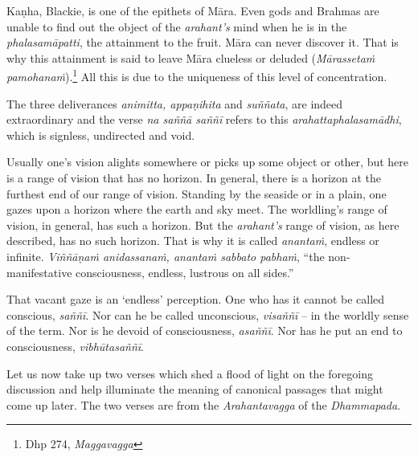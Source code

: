 Kaṇha, Blackie, is one of the epithets of Māra. Even gods and Brahmas are unable to find out the object of the \emph{arahant's} mind when he is in the \emph{phalasamāpatti}, the attainment to the fruit. Māra can never discover it. That is why this attainment is said to leave Māra clueless or deluded (\emph{Mārassetaṁ pamohanaṁ}).\footnote{Dhp 274, \emph{Maggavagga}} All this is due to the uniqueness of this level of concentration.

The three deliverances \emph{animitta, appaṇihita} and \emph{suññata}, are indeed extraordinary and the verse \emph{na saññā saññī} refers to this \emph{arahattaphalasamādhi}, which is signless, undirected and void.

Usually one's vision alights somewhere or picks up some object or other, but here is a range of vision that has no horizon. In general, there is a horizon at the furthest end of our range of vision. Standing by the seaside or in a plain, one gazes upon a horizon where the earth and sky meet. The worldling's range of vision, in general, has such a horizon. But the \emph{arahant's} range of vision, as here described, has no such horizon. That is why it is called \emph{anantaṁ}, endless or infinite. \emph{Viññāṇaṁ anidassanaṁ, anantaṁ sabbato pabhaṁ}, ``the non-manifestative consciousness, endless, lustrous on all sides.''

That vacant gaze is an `endless' perception. One who has it cannot be called conscious, \emph{saññī}. Nor can he be called unconscious, \emph{visaññī} -- in the worldly sense of the term. Nor is he devoid of consciousness, \emph{asaññī}. Nor has he put an end to consciousness, \emph{vibhūtasaññī}.

Let us now take up two verses which shed a flood of light on the foregoing discussion and help illuminate the meaning of canonical passages that might come up later. The two verses are from the \emph{Arahantavagga} of the \emph{Dhammapada}.

\clearpage

